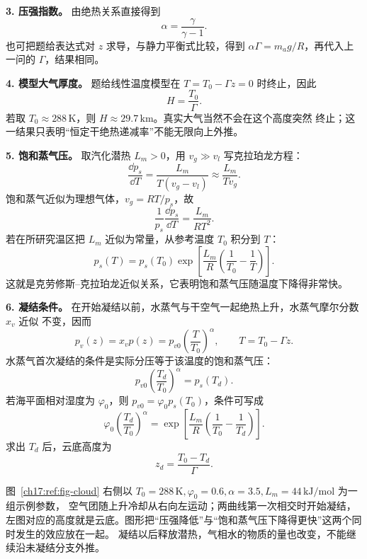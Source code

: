 {\begin{xesolution}
\textbf{3. 压强指数。} 由绝热关系直接得到
\[
  \boxed{\alpha=\frac{\gamma}{\gamma-1}}.
\]
也可把题给表达式对 $z$ 求导，与静力平衡式比较，得到 $\alpha\Gamma=m_ag/R$，再代入上一问的
$\Gamma$，结果相同。

\textbf{4. 模型大气厚度。} 题给线性温度模型在 $T=T_0-\Gamma z=0$ 时终止，因此
\[
  \boxed{H=\frac{T_0}{\Gamma}}.
\]
若取 $T_0\approx288\,\mathrm K$，则 $H\approx29.7\,\mathrm{km}$。真实大气当然不会在这个高度突然
终止；这一结果只表明“恒定干绝热递减率”不能无限向上外推。

\textbf{5. 饱和蒸气压。} 取汽化潜热 $L_m>0$，用 $v_g\gg v_l$ 写克拉珀龙方程：
\[
  \frac{\dd p_s}{\dd T}
  =\frac{L_m}{T(v_g-v_l)}
  \approx\frac{L_m}{Tv_g}.
\]
饱和蒸气近似为理想气体，$v_g=RT/p_s$，故
\[
  \frac{1}{p_s}\frac{\dd p_s}{\dd T}
  =\frac{L_m}{RT^2}.
\]
若在所研究温区把 $L_m$ 近似为常量，从参考温度 $T_0$ 积分到 $T$：
\[
  \boxed{p_s(T)=p_s(T_0)
  \exp\!\left[\frac{L_m}{R}\left(\frac1{T_0}-\frac1T\right)\right]}.
\]
这就是克劳修斯--克拉珀龙近似关系，它表明饱和蒸气压随温度下降得非常快。

\textbf{6. 凝结条件。} 在开始凝结以前，水蒸气与干空气一起绝热上升，水蒸气摩尔分数 $x_v$ 近似
不变，因而
\[
  p_v(z)=x_vp(z)=p_{v0}\left(\frac{T}{T_0}\right)^\alpha,
  \qquad T=T_0-\Gamma z.
\]
水蒸气首次凝结的条件是实际分压等于该温度的饱和蒸气压：
\[
  \boxed{p_{v0}\left(\frac{T_d}{T_0}\right)^\alpha=p_s(T_d)}.
\]
若海平面相对湿度为 $\varphi_0$，则 $p_{v0}=\varphi_0p_s(T_0)$，条件可写成
\[
  \boxed{\varphi_0\left(\frac{T_d}{T_0}\right)^\alpha
  =\exp\!\left[\frac{L_m}{R}
  \left(\frac1{T_0}-\frac1{T_d}\right)\right]}.
\]
求出 $T_d$ 后，云底高度为
\[
  \boxed{z_d=\frac{T_0-T_d}{\Gamma}}.
\]

\par\noindent\begin{minipage}{\linewidth}
\par\noindent\begin{minipage}{\linewidth}
\cloudFormationFigure
{}\label{ch17:ref:fig-cloud}
\end{minipage}\par\medskip
\end{minipage}\par\smallskip

图~\ref{ch17:ref:fig-cloud} 右侧以 $T_0=288\,\mathrm K,\varphi_0=0.6,\alpha=3.5,L_m=44\,\mathrm{kJ/mol}$ 为一组示例参数，
空气团随上升冷却从右向左运动；两曲线第一次相交时开始凝结，
左图对应的高度就是云底。图形把“压强降低”与“饱和蒸气压下降得更快”这两个同时发生的效应放在一起。
凝结以后释放潜热，气相水的物质的量也改变，不能继续沿未凝结分支外推。
\end{xesolution}
}

\endgroup

\hypersetup{bookmarksdepth=2}
